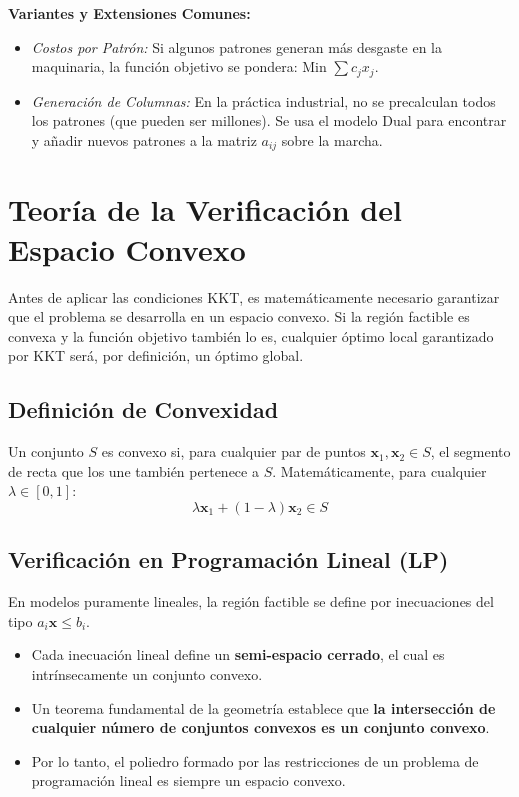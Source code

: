 \documentclass{article}
\begin{document}
	\textbf{Variantes y Extensiones Comunes:}
	\begin{itemize}
		\item \textit{Costos por Patrón:} Si algunos patrones generan más desgaste en la maquinaria, la función objetivo se pondera: $\text{Min } \sum c_j x_j$.
		\item \textit{Generación de Columnas:} En la práctica industrial, no se precalculan todos los patrones (que pueden ser millones). Se usa el modelo Dual para encontrar y añadir nuevos patrones a la matriz $a_{ij}$ sobre la marcha.
	\end{itemize}
	
	
	\newpage
	
	\section{Teoría de la Verificación del Espacio Convexo}
	Antes de aplicar las condiciones KKT, es matemáticamente necesario garantizar que el problema se desarrolla en un espacio convexo. Si la región factible es convexa y la función objetivo también lo es, cualquier óptimo local garantizado por KKT será, por definición, un óptimo global.
	
	\subsection{Definición de Convexidad}
	Un conjunto $S$ es convexo si, para cualquier par de puntos $\mathbf{x}_1, \mathbf{x}_2 \in S$, el segmento de recta que los une también pertenece a $S$. Matemáticamente, para cualquier $\lambda \in [0, 1]$:
	$$\lambda \mathbf{x}_1 + (1 - \lambda) \mathbf{x}_2 \in S$$
	
	\subsection{Verificación en Programación Lineal (LP)}
	En modelos puramente lineales, la región factible se define por inecuaciones del tipo $a_i \mathbf{x} \leq b_i$.
	\begin{itemize}
		\item Cada inecuación lineal define un \textbf{semi-espacio cerrado}, el cual es intrínsecamente un conjunto convexo.
		\item Un teorema fundamental de la geometría establece que \textbf{la intersección de cualquier número de conjuntos convexos es un conjunto convexo}.
		\item Por lo tanto, el poliedro formado por las restricciones de un problema de programación lineal es siempre un espacio convexo.
	\end{itemize}
	
\end{document}
